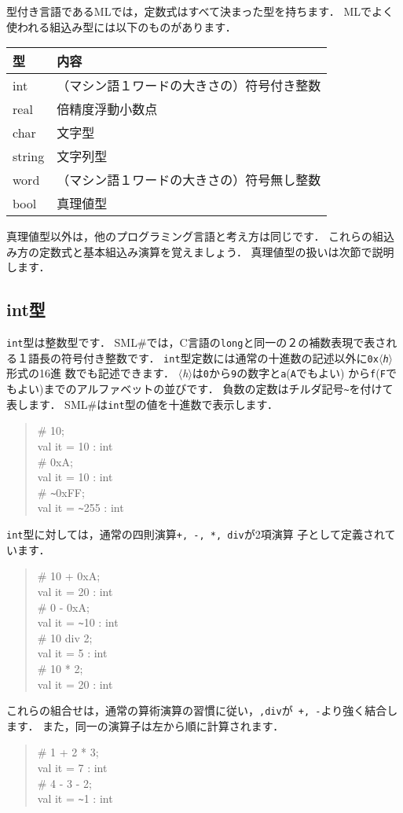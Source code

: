 \documentclass{jbook}
\newif\ifjp
\newcommand{\smlsharp}{SML\#}
\newcommand{\code}[1]{\mbox{\large\tt #1}}
\newcommand{\nonterm}[1]{\mbox{$\langle$}{\it #1}\mbox{$\rangle$}}
\newenvironment{program}{\begin{quote}\begin{tt}}%
                        {\end{tt}\end{quote}}
\begin{document}
\ifjp%
	型付き言語であるMLでは，定数式はすべて決まった型を持ちます．
	MLでよく使われる組込み型には以下のものがあります．

\begin{center}
\begin{tabular}{|l|l|}
\hline
型 & 内容
\\ \hline
int & （マシン語１ワードの大きさの）符号付き整数
\\ \hline
real & 倍精度浮動小数点
\\ \hline
char & 文字型
\\ \hline
string & 文字列型
\\ \hline
word & （マシン語１ワードの大きさの）符号無し整数
\\ \hline
bool & 真理値型
\\ \hline
\end{tabular}
\end{center}
	真理値型以外は，他のプログラミング言語と考え方は同じです．
	これらの組込み方の定数式と基本組込み演算を覚えましょう．
	真理値型の扱いは次節で説明します．	

\subsection{int型}
	{\tt int}型は整数型です．
	\smlsharp{}では，C言語の\code{long}と同一の２の補数表現で表され
る１語長の符号付き整数です．
	{\tt int}型定数には通常の十進数の記述以外に{\tt 0x\nonterm{h}}形式の16進
数でも記述できます．
	\nonterm{h}は{\tt 0}から{\tt 9}の数字と{\tt a}({\tt A}でもよい)
から{\tt f}({\tt F}でもよい)までのアルファベットの並びです．
	負数の定数はチルダ記号\verb|~|を付けて表します．
	\smlsharp{}は{\tt int}型の値を十進数で表示します．
\begin{program}
\# 10;\\
val it = 10 : int\\
\# 0xA;\\
val it = 10 : int\\
\# \verb|~|0xFF;\\
val it = \verb|~|255 : int
\end{program}
	{\tt int}型に対しては，通常の四則演算{\tt +, -, *, div}が2項演算
子として定義されています．
\begin{program}
\# 10 + 0xA;\\
val it = 20 : int\\
\# 0 - 0xA;\\
val it = \verb|~|10 : int\\
\# 10 div 2;\\
val it = 5 : int\\
\# 10 * 2;\\
val it = 20 : int
\end{program}
	これらの組合せは，通常の算術演算の習慣に従い，{\tt *,div}が{\tt
+, -}より強く結合します．
	また，同一の演算子は左から順に計算されます．
\begin{program}
\# 1 + 2 * 3;\\
val it = 7 : int\\
\# 4 - 3 - 2;\\
val it = \verb|~|1 : int
\end{program}
\end{document}
